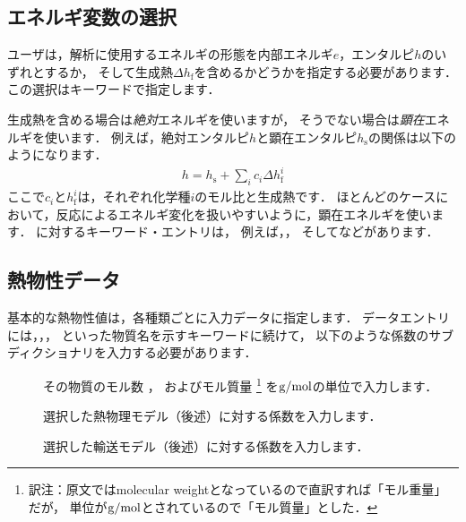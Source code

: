 \subsection{エネルギ変数の選択}
\label{ssec:7.1.6@3.0.1}
ユーザは，解析に使用するエネルギの形態を内部エネルギ$e$，エンタルピ$h$のいずれとするか，
そして生成熱$\Delta h_{\mathrm{f}}$を含めるかどうかを指定する必要があります．
この選択はキーワードで指定します．

生成熱を含める場合は\emph{絶対}エネルギを使いますが，
そうでない場合は\emph{顕在}エネルギを使います．
例えば，絶対エンタルピ$h$と顕在エンタルピ$h_{\mathrm{s}}$の関係は以下のようになります．
\begin{align}
 \label{eq:7.1@2.2.0}
 h = h_{\mathrm{s}} + \sum_{i}c_{i}\Delta h_{\mathrm{f}}^{i}
\end{align}
ここで$c_{i}$と$h_{\mathrm{f}}^{i}$は，それぞれ化学種$i$のモル比と生成熱です．
ほとんどのケースにおいて，反応によるエネルギ変化を扱いやすいように，顕在エネルギを使います．
%
%
に対するキーワード・エントリは，
例えば，，
そしてなどがあります．


\subsection{熱物性データ}
\label{ssec:7.1.1}
基本的な熱物性値は，各種類ごとに入力データに指定します．
データエントリには，，，
といった物質名を示すキーワードに続けて，
以下のような係数のサブディクショナリを入力する必要があります．
\begin{description}
 \item[]
%
%
            その物質のモル数
%
%
            ，
            およびモル質量%
\footnote{訳注：原文ではmolecular weightとなっているので直訳すれば「モル重量」だが，
            単位が$\unit*{g/mol}$とされているので「モル質量」とした．}%
%
%
            を$\unit*{g/mol}$の単位で入力します．
%
%
 \item[] 選択した熱物理モデル（後述）に対する係数を入力します．
%
%
 \item[] 選択した輸送モデル（後述）に対する係数を入力します．
\end{description}

